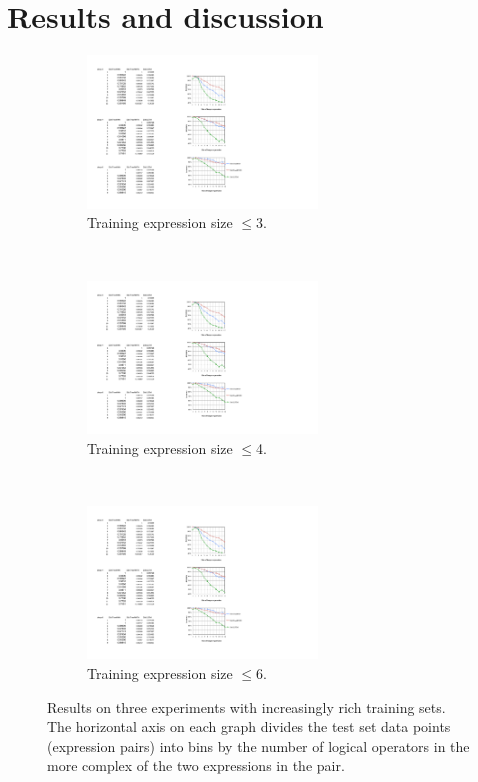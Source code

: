 \section{Results and discussion}\label{sec:discussion}

\begin{figure}[t!]
  \centering
\begin{subfigure}[t]{0.29\textwidth}
  \includegraphics[height=1.6in]{fig3.pdf}
  \caption{Training expression size $\le$3.}
  \end{subfigure}~~
\begin{subfigure}[t]{0.29\textwidth}
    \includegraphics[height=1.6in]{fig4.pdf}
  \caption{Training expression size $\le$4.}
  \end{subfigure}~~
\begin{subfigure}[t]{0.4\textwidth}
      \includegraphics[height=1.6in]{fig6.pdf}
  \caption{Training expression size $\le$6.}
\end{subfigure}
  \caption{Results on three experiments with increasingly rich training sets. The horizontal axis on each graph divides the test set data points (expression pairs) into bins by the number of logical operators in the more complex of the two expressions in the pair.}
  \label{prop-results} 
\end{figure}

